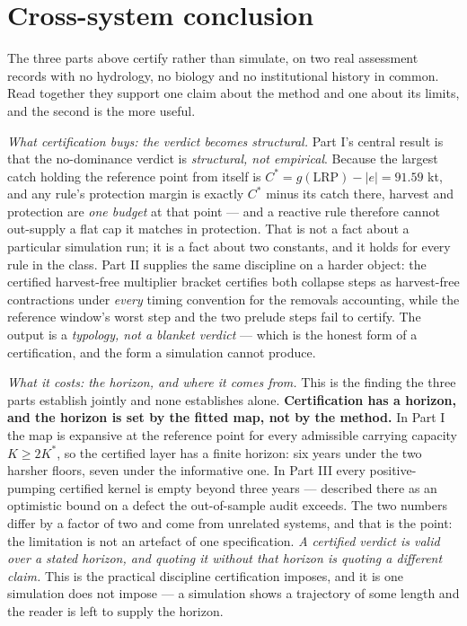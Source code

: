 \section{Cross-system conclusion}
\label{conclusion}

The three parts above certify rather than simulate, on two real assessment records with no hydrology,
no biology and no institutional history in common. Read together they support one claim about the
method and one about its limits, and the second is the more useful.

\emph{What certification buys: the verdict becomes structural.} Part I's central result is that the
no-dominance verdict is \emph{structural, not empirical}. Because the largest catch holding the
reference point from itself is $C^* = g(\mathrm{LRP}) - |e| = 91.59$ kt, and any rule's protection
margin is exactly $C^*$ minus its catch there, harvest and protection are \emph{one budget} at that
point --- and a reactive rule therefore cannot out-supply a flat cap it matches in protection. That
is not a fact about a particular simulation run; it is a fact about two constants, and it holds for
every rule in the class. Part II supplies the same discipline on a harder object: the certified
harvest-free multiplier bracket certifies both collapse steps as harvest-free contractions under
\emph{every} timing convention for the removals accounting, while the reference window's worst step
and the two prelude steps fail to certify. The output is a \emph{typology, not a blanket verdict} ---
which is the honest form of a certification, and the form a simulation cannot produce.

\emph{What it costs: the horizon, and where it comes from.} This is the finding the three parts
establish jointly and none establishes alone. \textbf{Certification has a horizon, and the horizon
is set by the fitted map, not by the method.} In Part I the map is expansive at the reference point
for every admissible carrying capacity $K \ge 2K^*$, so the certified layer has a finite horizon:
six years under the two harsher floors, seven under the informative one. In Part III every
positive-pumping certified kernel is empty beyond three years --- described there as an optimistic
bound on a defect the out-of-sample audit exceeds. The two numbers differ by a factor of two and
come from unrelated systems, and that is the point: the limitation is not an artefact of one
specification. \emph{A certified verdict is valid over a stated horizon, and quoting it without that
horizon is quoting a different claim.} This is the practical discipline certification imposes, and
it is one simulation does not impose --- a simulation shows a trajectory of some length and the
reader is left to supply the horizon.

